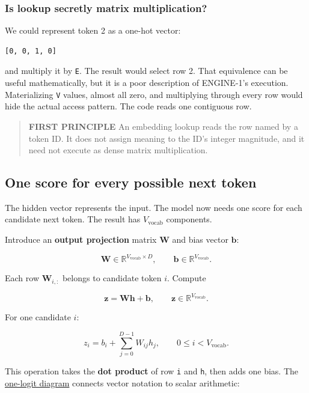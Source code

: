 \documentclass[
  10pt,
]{article}
\begin{document}
\subsubsection{Is lookup secretly matrix
multiplication?}\label{is-lookup-secretly-matrix-multiplication}

We could represent token 2 as a one-hot vector:

\begin{verbatim}
[0, 0, 1, 0]
\end{verbatim}

and multiply it by \texttt{E}. The result would select row 2. That
equivalence can be useful mathematically, but it is a poor description
of ENGINE-1's execution. Materializing \texttt{V} values, almost all
zero, and multiplying through every row would hide the actual access
pattern. The code reads one contiguous row.

\begin{quote}
\textbf{FIRST PRINCIPLE} An embedding lookup reads the row named by a
token ID. It does not assign meaning to the ID's integer magnitude, and
it need not execute as dense matrix multiplication.
\end{quote}

\subsection{One score for every possible next
token}\label{one-score-for-every-possible-next-token}

The hidden vector represents the input. The model now needs one score
for each candidate next token. The result has \(V_{\mathrm{vocab}}\)
components.

Introduce an \textbf{output projection} matrix \(\mathbf{W}\) and bias
vector \(\mathbf{b}\):

\[
\mathbf{W}\in\mathbb{R}^{V_{\mathrm{vocab}}\times D},
\qquad \mathbf{b}\in\mathbb{R}^{V_{\mathrm{vocab}}}.
\]

Each row \(\mathbf{W}_{i,:}\) belongs to candidate token \(i\). Compute

\[
\mathbf{z}=\mathbf{W}\mathbf{h}+\mathbf{b},
\qquad \mathbf{z}\in\mathbb{R}^{V_{\mathrm{vocab}}}.
\]

For one candidate \(i\):

\[
z_i=b_i+\sum_{j=0}^{D-1}W_{ij}h_j,
\qquad 0\le i<V_{\mathrm{vocab}}.
\]

This operation takes the \textbf{dot product} of row \texttt{i} and
\texttt{h}, then adds one bias. The
\href{https://github.com/hermonai/inside-the-llm-engine/blob/astra-visual-rewrite/diagrams/model/one-logit-dot-product.txt}{one-logit
diagram} connects vector notation to scalar arithmetic:
\end{document}
